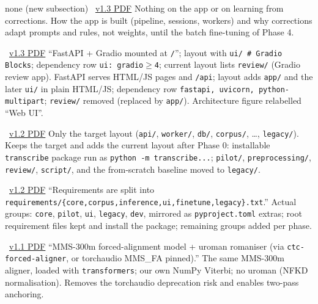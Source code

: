 \documentclass[11pt]{article}
\begin{document}
 {none (new subsection) \textperiodcentered\ \href{archive/v1.3/02_TRD.pdf}{v1.3 PDF}}
 {Nothing on the app or on learning from corrections.}
 {How the app is built (pipeline, sessions, workers) and why corrections adapt prompts and rules, not weights, until the batch fine-tuning of Phase 4.}

 { \textperiodcentered\ \href{archive/v1.3/02_TRD.pdf}{v1.3 PDF}}
 {``FastAPI + Gradio mounted at \texttt{/}''; layout with \texttt{ui/ \# Gradio Blocks}; dependency row \texttt{ui: gradio$\ge$4}; current layout lists \texttt{review/} (Gradio review app).}
 {FastAPI serves HTML/JS pages and \texttt{/api}; layout adds \texttt{app/} and the later \texttt{ui/} in plain HTML/JS; dependency row \texttt{fastapi, uvicorn, python-multipart}; \texttt{review/} removed (replaced by \texttt{app/}). Architecture figure relabelled ``Web UI''.}

 { \textperiodcentered\ \href{archive/v1.2/02_TRD.pdf}{v1.2 PDF}}
 {Only the target layout (\texttt{api/}, \texttt{worker/}, \texttt{db/}, \texttt{corpus/}, \ldots, \texttt{legacy/}).}
 {Keeps the target and adds the current layout after Phase 0: installable \texttt{transcribe} package run as \texttt{python -m transcribe...}; \texttt{pilot/}, \texttt{preprocessing/}, \texttt{review/}, \texttt{script/}, and the from-scratch baseline moved to \texttt{legacy/}.}

 { \textperiodcentered\ \href{archive/v1.2/02_TRD.pdf}{v1.2 PDF}}
 {``Requirements are split into \texttt{requirements/\{core,corpus,inference,ui,finetune,legacy\}.txt}.''}
 {Actual groups: \texttt{core}, \texttt{pilot}, \texttt{ui}, \texttt{legacy}, \texttt{dev}, mirrored as \texttt{pyproject.toml} extras; root requirement files kept and install the package; remaining groups added per phase.}

 { \textperiodcentered\ \href{archive/v1.1/02_TRD.pdf}{v1.1 PDF}}
 {``MMS-300m forced-alignment model + uroman romaniser (via \texttt{ctc-forced-aligner}, or torchaudio MMS\_FA pinned).''}
 {The same MMS-300m aligner, loaded with \texttt{transformers}; our own NumPy Viterbi; no uroman (NFKD normalisation). Removes the torchaudio deprecation risk and enables two-pass anchoring.}
\end{document}
